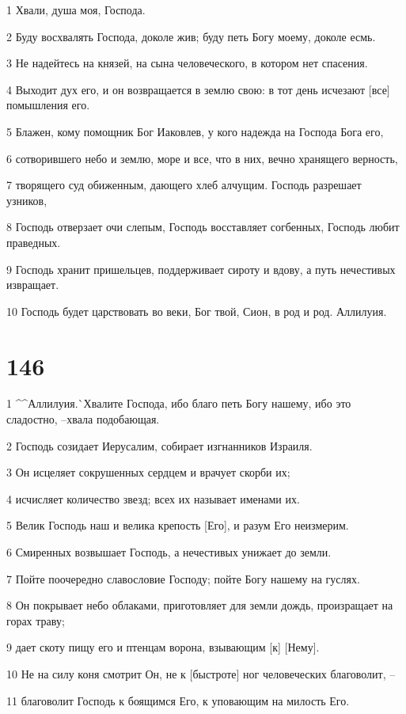\par 1 Хвали, душа моя, Господа.
\par 2 Буду восхвалять Господа, доколе жив; буду петь Богу моему, доколе есмь.
\par 3 Не надейтесь на князей, на сына человеческого, в котором нет спасения.
\par 4 Выходит дух его, и он возвращается в землю свою: в тот день исчезают [все] помышления его.
\par 5 Блажен, кому помощник Бог Иаковлев, у кого надежда на Господа Бога его,
\par 6 сотворившего небо и землю, море и все, что в них, вечно хранящего верность,
\par 7 творящего суд обиженным, дающего хлеб алчущим. Господь разрешает узников,
\par 8 Господь отверзает очи слепым, Господь восставляет согбенных, Господь любит праведных.
\par 9 Господь хранит пришельцев, поддерживает сироту и вдову, а путь нечестивых извращает.
\par 10 Господь будет царствовать во веки, Бог твой, Сион, в род и род. Аллилуия.

\chapter{146}

\par 1 ^^Аллилуия.^^ Хвалите Господа, ибо благо петь Богу нашему, ибо это сладостно, --хвала подобающая.
\par 2 Господь созидает Иерусалим, собирает изгнанников Израиля.
\par 3 Он исцеляет сокрушенных сердцем и врачует скорби их;
\par 4 исчисляет количество звезд; всех их называет именами их.
\par 5 Велик Господь наш и велика крепость [Его], и разум Его неизмерим.
\par 6 Смиренных возвышает Господь, а нечестивых унижает до земли.
\par 7 Пойте поочередно славословие Господу; пойте Богу нашему на гуслях.
\par 8 Он покрывает небо облаками, приготовляет для земли дождь, произращает на горах траву;
\par 9 дает скоту пищу его и птенцам ворона, взывающим [к] [Нему].
\par 10 Не на силу коня смотрит Он, не к [быстроте] ног человеческих благоволит, --
\par 11 благоволит Господь к боящимся Его, к уповающим на милость Его.

